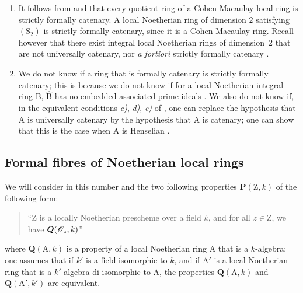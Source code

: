 \begin{remarks}[7.2.10]
\label{IV.7.2.10}
\begin{enumerate}[label=\emph{\roman*)}]
  \item It follows from  and  that every quotient ring of a Cohen-Macaulay local ring is strictly formally catenary.
  A local Noetherian ring of dimension $2$ satisfying $(\mathrm{S}_2)$ is strictly formally catenary, since it is a Cohen-Macaulay ring.
  Recall however that there exist integral local Noetherian rings of dimension~$2$ that are not universally catenary, nor \emph{a fortiori} strictly formally catenary .

  \item We do not know if a ring that is formally catenary  is strictly formally catenary; this is because we do not know if for a local Noetherian integral ring $\mathrm{B}$, $\widehat{\mathrm{B}}$ has no embedded associated prime ideals .
  We also do not know if, in the equivalent conditions \emph{c)}, \emph{d)}, \emph{e)} of , one can replace the hypothesis that $\mathrm{A}$ is universally catenary by the hypothesis that $\mathrm{A}$ is catenary; one can show that this is the case when $\mathrm{A}$ is Henselian .
\end{enumerate}
\end{remarks}


\subsection{Formal fibres of Noetherian local rings}
\label{subsection:IV.7.3}

\begin{env}[7.3.1]
\label{IV.7.3.1}
We will consider in this number and the two following properties $\boldsymbol{P}(\mathrm{Z},k)$ of the following form:
\begin{quote}
``$\mathrm{Z}$ is a locally Noetherian prescheme over a field $k$,
and for all $z\in\mathrm{Z}$, we have $\boldsymbol{Q}(\mathscr{O}_z,k)$''
\end{quote}
where $\boldsymbol{Q}(\mathrm{A},k)$ is a property of a local Noetherian ring $\mathrm{A}$ that is a $k$-algebra; one assumes that if $k'$ is a field isomorphic to $k$, and if $\mathrm{A}'$ is a local Noetherian ring that is a $k'$-algebra di-isomorphic to $\mathrm{A}$, the properties $\boldsymbol{Q}(\mathrm{A},k)$ and $\boldsymbol{Q}(\mathrm{A}',k')$ are equivalent.
\end{env}

